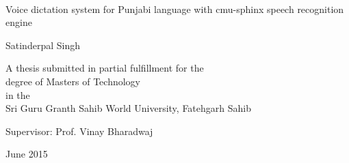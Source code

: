 \documentclass[12pt,a4paper,oldfontcommands]{memoir}
\begin{document}
%
%
\thispagestyle{empty}

{%
\sffamily
\centering
\Large

~\vspace{\fill}

{\huge 
Voice dictation system for Punjabi language with cmu-sphinx speech recognition engine
}

\vspace{2.5cm}

{\LARGE
Satinderpal Singh
}

\vspace{3.5cm}

A thesis submitted in partial fulfillment for the\\
degree of Masters of Technology\\[1em]
in the\\[1em]
Sri Guru Granth Sahib World University, Fatehgarh Sahib

\vspace{3.5cm}

Supervisor: Prof. Vinay Bharadwaj

\vspace{\fill}

June 2015

}%
\end{document}
